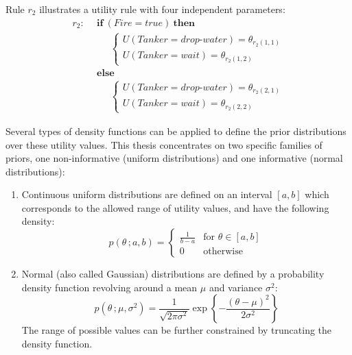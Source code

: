 Rule $r_{2}$ illustrates a utility rule with four independent parameters:
\begin{align*}
r_{2}: \ \ & \textbf{if} \ (\mathit{Fire}\!=\!\mathit{true}) \ \textbf{then} \\
& \;\;\;\;\;  \begin{cases}
U(\mathit{Tanker}\!=\!\mathit{drop\mbox{-}water}) = \theta_{r_{2}(1,1)} \\
U(\mathit{Tanker}\!=\!\mathit{wait}) = \theta_{r_{2}(1,2)}
\end{cases} \\
& \textbf{else} \\
& \;\;\;\;\; \begin{cases}
U (\mathit{Tanker}\!=\!\mathit{drop\mbox{-}water}) = \theta_{r_{2}(2,1)} \\
U(\mathit{Tanker}\!=\!\mathit{wait}) = \theta_{r_{2}(2,2)}
\end{cases}
\end{align*}

Several types of density functions can be applied to define the prior distributions over these utility values.  This thesis concentrates on two specific families of priors, one non-informative (uniform distributions) and one informative (normal distributions): 
\begin{enumerate}
\item Continuous uniform distributions are defined on an interval $[a,b]$ which corresponds to the allowed range of utility values, and have the following density:
\begin{equation}
p(\theta\,; a, b) = \begin{cases}
\frac{1}{b - a} & \text{for } \theta \in [a,b]  \\
0               & \text{otherwise}
\end{cases}
\end{equation}

\item Normal (also called Gaussian) distributions are defined by a probability density function revolving around a mean $\mu$ and variance $\sigma^2$:
\begin{equation}
p(\theta\,; \mu, \sigma^2) = \frac{1}{\sqrt{2\pi\sigma^2}}\operatorname{exp}\left\{-\frac{\left(\theta-\mu\right)^2}{2\sigma^2}\right\}
\end{equation}
The range of possible values can be further constrained by truncating the density function.

\end{enumerate}

